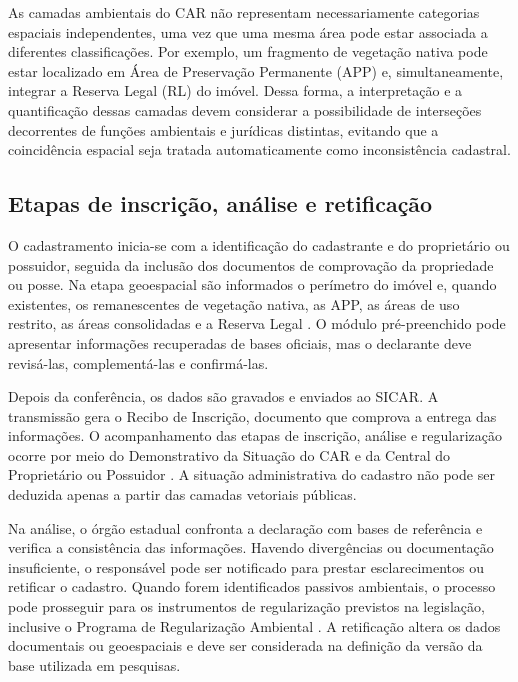 As camadas ambientais do CAR não representam necessariamente categorias espaciais independentes, uma vez que uma mesma área pode estar associada a diferentes classificações. Por exemplo, um fragmento de vegetação nativa pode estar localizado em Área de Preservação Permanente (APP) e, simultaneamente, integrar a Reserva Legal (RL) do imóvel. Dessa forma, a interpretação e a quantificação dessas camadas devem considerar a possibilidade de interseções decorrentes de funções ambientais e jurídicas distintas, evitando que a coincidência espacial seja tratada automaticamente como inconsistência cadastral.

\subsection{Etapas de inscrição, análise e retificação}

O cadastramento inicia-se com a identificação do cadastrante e do proprietário ou possuidor, seguida da inclusão dos documentos de comprovação da propriedade ou posse. Na etapa geoespacial são informados o perímetro do imóvel e, quando existentes, os remanescentes de vegetação nativa, as APP, as áreas de uso restrito, as áreas consolidadas e a Reserva Legal \cite{mma2014,car2026}. O módulo pré-preenchido pode apresentar informações recuperadas de bases oficiais, mas o declarante deve revisá-las, complementá-las e confirmá-las.

Depois da conferência, os dados são gravados e enviados ao SICAR. A transmissão gera o Recibo de Inscrição, documento que comprova a entrega das informações. O acompanhamento das etapas de inscrição, análise e regularização ocorre por meio do Demonstrativo da Situação do CAR e da Central do Proprietário ou Possuidor \cite{brasilservicocar2025}. A situação administrativa do cadastro não pode ser deduzida apenas a partir das camadas vetoriais públicas.

Na análise, o órgão estadual confronta a declaração com bases de referência e verifica a consistência das informações. Havendo divergências ou documentação insuficiente, o responsável pode ser notificado para prestar esclarecimentos ou retificar o cadastro. Quando forem identificados passivos ambientais, o processo pode prosseguir para os instrumentos de regularização previstos na legislação, inclusive o Programa de Regularização Ambiental \cite{sfbregularizacao2026}. A retificação altera os dados documentais ou geoespaciais e deve ser considerada na definição da versão da base utilizada em pesquisas.

